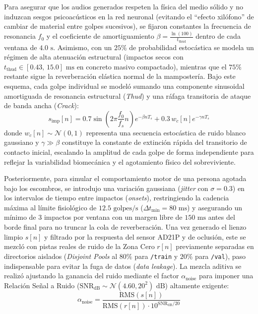 \documentclass[11pt, a4paper]{article}
\begin{document}
Para asegurar que los audios generados respeten la física del medio sólido y no induzcan sesgos psicoacústicos en la red neuronal (evitando el ``efecto xilófono'' de cambiar de material entre golpes sucesivos), se fijaron constantes la frecuencia de resonancia $f_0$ y el coeficiente de amortiguamiento $\beta = \frac{\ln(100)}{t_{\text{thud}}}$ dentro de cada ventana de $4.0\text{ s}$. Asimismo, con un $25\%$ de probabilidad estocástica se modela un régimen de alta atenuación estructural (impactos secos con $t_{\text{thud}} \in [0.43, \, 15.0]\text{ ms}$ en concreto masivo compactado), mientras que el $75\%$ restante sigue la reverberación elástica normal de la mampostería. Bajo este esquema, cada golpe individual se modeló sumando una componente sinusoidal amortiguada de resonancia estructural (\textit{Thud}) y una ráfaga transitoria de ataque de banda ancha (\textit{Crack}):
\begin{equation}
    s_{\text{imp}}[n] = 0.7 \sin\left(2\pi \frac{f_0}{f_s} n\right) e^{-\beta n T_s} + 0.3 \, w_c[n] e^{-\gamma n T_s}
\end{equation}
donde $w_c[n] \sim \mathcal{N}(0, 1)$ representa una secuencia estocástica de ruido blanco gaussiano y $\gamma \gg \beta$ constituye la constante de extinción rápida del transitorio de contacto inicial, escalando la amplitud de cada golpe de forma independiente para reflejar la variabilidad biomecánica y el agotamiento físico del sobreviviente.

Posteriormente, para simular el comportamiento motor de una persona agotada bajo los escombros, se introdujo una variación gaussiana (\textit{jitter} con $\sigma = 0.3$) en los intervalos de tiempo entre impactos (\textit{onsets}), restringiendo la cadencia máxima al límite fisiológico de $12.5\text{ golpes/s}$ ($\Delta t_{\min} = 80\text{ ms}$) y asegurando un mínimo de $3$ impactos por ventana con un margen libre de $150\text{ ms}$ antes del borde final para no truncar la cola de reverberación. Una vez generado el lienzo limpio $s[n]$ y filtrado por la respuesta del sensor AD21P y de oclusión, este se mezcló con pistas reales de ruido de la Zona Cero $r[n]$ previamente separadas en directorios aislados (\textit{Disjoint Pools} al $80\%$ para \texttt{/train} y $20\%$ para \texttt{/val}), paso indispensable para evitar la fuga de datos (\textit{data leakage}). La mezcla aditiva se realizó ajustando la ganancia del ruido mediante el factor $\alpha_{\text{noise}}$ para imponer una Relación Señal a Ruido ($\text{SNR}_{\text{dB}} \sim \mathcal{N}(4.60, 20^2)\text{ dB}$) altamente exigente:
\begin{equation}
    \alpha_{\text{noise}} = \frac{\text{RMS}(s[n])}{\text{RMS}(r[n]) \cdot 10^{\text{SNR}_{\text{dB}} / 20}}
\end{equation}
\end{document}

